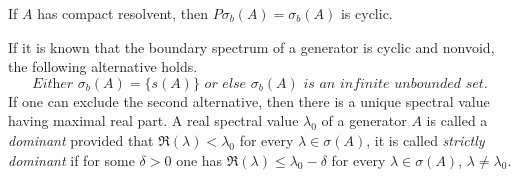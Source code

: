 \begin{corollary}\label{cor:b3-2.10}
If\/ $A$ has compact resolvent, then $P\sigma_{b}(A) = \sigma_{b}(A)$ is cyclic.
\end{corollary}
If it is known that the boundary spectrum of a generator is cyclic and nonvoid, the following alternative holds.
\begin{equation}\label{eq:b3-2.19}
\textit{Either $\sigma_{b}(A) = \{ s(A) \} $ or else  $\sigma_{b}(A)$ is an infinite unbounded set.}
\end{equation}
If one can exclude the second alternative, then there is a unique spectral value having maximal real part.
A real spectral value $\lambda_{0}$ of a generator $A$ is called a \emph{dominant}
provided that $\Re(\lambda) < \lambda_{0}$ for every $\lambda \in \sigma(A)$, it is called \emph{strictly dominant}
if for some $\delta > 0$ one has $\Re(\lambda) \leq \lambda_{0} - \delta$ for every $\lambda \in \sigma(A)$, $\lambda \neq \lambda_{0}$.

